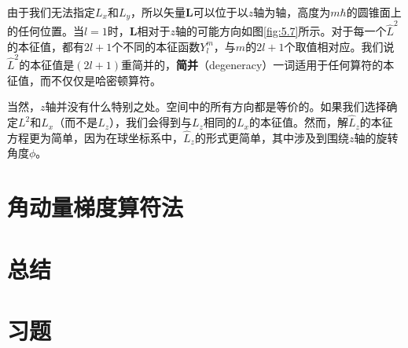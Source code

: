     由于我们无法指定$L_x$和$L_y$，所以矢量$\mathbf{L}$可以位于以$z$轴为轴，高度为$m\hbar$的圆锥面上的任何位置。当$l=1$时，$\mathbf{L}$相对于$z$轴的可能方向如图\ref{fig:5.7}所示。对于每一个$\hat{L}^2$的本征值，都有$2l+1$个不同的本征函数$Y_l^m$，与$m$的$2l+1$个取值相对应。我们说$\hat{L}^2$的本征值是$\left(2l+1\right)$重简并的，\textbf{简并}（degeneracy）一词适用于任何算符的本征值，而不仅仅是哈密顿算符。

    当然，$z$轴并没有什么特别之处。空间中的所有方向都是等价的。如果我们选择确定$L^2$和$L_x$（而不是$L_z$），我们会得到与$L_z$相同的$L_x$的本征值。然而，解$\hat{L}_z$的本征方程更为简单，因为在球坐标系中，$\hat{L}_z$的形式更简单，其中涉及到围绕$z$轴的旋转角度$\phi$。

\section{角动量梯度算符法}
\label{sec:5.4 The Ladder-Operator Method for Angular Momentum}








\section*{总结}

\section*{习题}